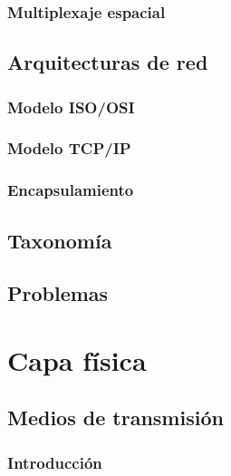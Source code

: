 \documentclass[
]{book}
\begin{document}
\hypertarget{multiplexaje-espacial}{%
\subsection{Multiplexaje espacial}\label{multiplexaje-espacial}}

\hypertarget{arquitecturas-de-red}{%
\section{Arquitecturas de red}\label{arquitecturas-de-red}}

\hypertarget{modelo-isoosi}{%
\subsection{Modelo ISO/OSI}\label{modelo-isoosi}}

\hypertarget{modelo-tcpip}{%
\subsection{Modelo TCP/IP}\label{modelo-tcpip}}

\hypertarget{encapsulamiento}{%
\subsection{Encapsulamiento}\label{encapsulamiento}}

\hypertarget{taxonomuxeda}{%
\section{Taxonomía}\label{taxonomuxeda}}

\hypertarget{problemas}{%
\section{Problemas}\label{problemas}}

\hypertarget{capa-fuxedsica}{%
\chapter{Capa física}\label{capa-fuxedsica}}

\hypertarget{medios-de-transmisiuxf3n}{%
\section{Medios de transmisión}\label{medios-de-transmisiuxf3n}}

\hypertarget{introducciuxf3n}{%
\subsection{Introducción}\label{introducciuxf3n}}
\end{document}
